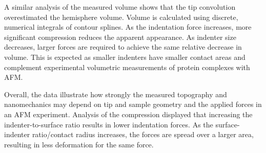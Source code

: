 A similar analysis of the measured volume shows that the tip convolution overestimated the hemisphere volume. Volume is calculated using discrete, numerical integrals of contour splines. As the indentation force increases, more significant compression reduces the apparent appearance. As indenter size decreases, larger forces are required to achieve the same relative decrease in volume. This is expected as smaller indenters have smaller contact areas and complement experimental volumetric measurements of protein complexes with AFM\cite{wu2008analysis,fuentes2013afm}. 

Overall, the data illustrate how strongly the measured topography and nanomechanics may depend on tip and sample geometry and the applied forces in an AFM experiment. Analysis of the compression displayed that increasing the indenter-to-surface ratio results in lower indentation forces. As the surface-indenter ratio/contact radius increases, the forces are spread over a larger area, resulting in less deformation for the same force.